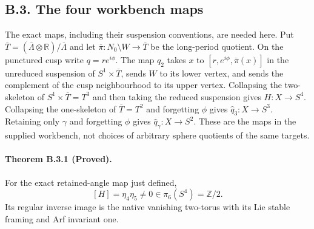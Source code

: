 \subsection{B.3. The four workbench maps}

The exact maps, including their suspension conventions, are
needed here.  Put $\overline T=(\overline\Lambda\otimes\mathbb R)
/\overline\Lambda$ and let $\overline\pi:N_0\setminus W
\to\overline T$ be the long-period quotient.  On the punctured
cusp write $q=re^{i\phi}$.  The map $q_2$ takes $x$ to
$[r,e^{i\phi},\overline\pi(x)]$ in the unreduced suspension
of $S^1\times\overline T$, sends $W$ to its lower vertex,
and sends the complement of the cusp neighbourhood to its
upper vertex.  Collapsing the two-skeleton of
$S^1\times\overline T=T^3$ and then taking the reduced
suspension gives $H:X\to S^4$.  Collapsing the one-skeleton
of $\overline T=T^2$ and forgetting $\phi$ gives
$\widehat q_3:X\to S^3$.  Retaining only $\gamma$ and
forgetting $\phi$ gives $\widehat q_\gamma:X\to S^2$.
These are the maps in the supplied workbench, not choices
of arbitrary sphere quotients of the same targets.

\paragraph{Theorem B.3.1 (Proved).}
For the exact retained-angle map just defined,
\[
 [H]=\eta_4\eta_5\ne0\in\pi_6(S^4)=\mathbb Z/2.
 \tag{B.3.1}
\]
Its regular inverse image is the native vanishing
two-torus with its Lie stable framing and Arf invariant one.

